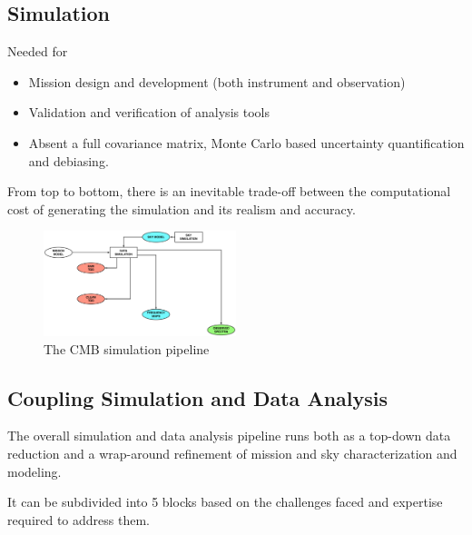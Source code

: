 \subsection{Simulation}

Needed for 
\begin{itemize}
\item Mission design and development (both instrument and observation)
\item Validation and verification of analysis tools
\item Absent a full covariance matrix, Monte Carlo based uncertainty quantification and debiasing.
\end{itemize}

From top to bottom, there is an inevitable trade-off between the computational cost of generating the simulation and its realism and accuracy.

\begin{figure}[htbp]
\includegraphics[width=0.5\textwidth]{sim}
\caption{The CMB simulation pipeline}
\label{default}

\end{figure}

\newpage

\subsection{Coupling Simulation and Data Analysis}

The overall simulation and data analysis pipeline runs both as a top-down data reduction and a wrap-around refinement of mission and sky characterization and modeling.

It can be subdivided into 5 blocks based on the challenges faced and expertise required to address them.

